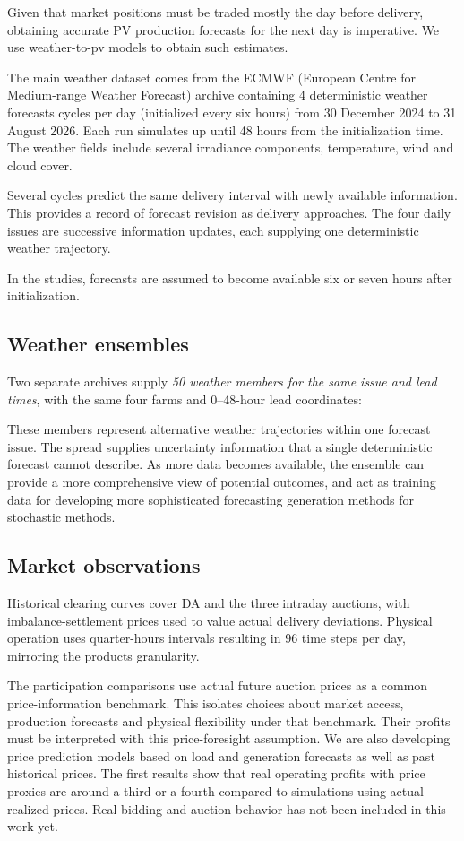 \documentclass[11pt,a4paper]{article}
\begin{document}
Given that market positions must be traded mostly the day before delivery, obtaining accurate
PV production forecasts for the next day is imperative. We use weather-to-pv models to obtain such estimates.

The main weather dataset comes from the ECMWF (European Centre for Medium-range Weather Forecast) archive
 containing 4 deterministic weather forecasts cycles per day (initialized every six hours)
from 30 December 2024 to 31 August 2026. Each run simulates up until 48 hours from the initialization time. 
The weather fields include several irradiance components, temperature, wind and cloud cover.

Several cycles predict the same delivery interval with newly available information. This
provides a record of forecast revision as delivery approaches. The four daily
issues are successive information updates, each supplying one deterministic
weather trajectory.

In the studies, forecasts are assumed to become available six or seven hours after
initialization.

\subsection{Weather ensembles}
Two separate archives supply \emph{50 weather members for the same issue and
lead times}, with the same four farms and 0--48-hour lead coordinates:

These members represent alternative weather trajectories within one forecast
issue. The spread supplies uncertainty information that a single deterministic forecast
cannot describe. As more data becomes available, the ensemble can provide a more comprehensive view of potential outcomes,
and act as training data for developing more sophisticated forecasting generation methods for stochastic methods.


\subsection{Market observations}
Historical clearing curves cover DA and the three intraday auctions, with
imbalance-settlement prices used to value actual delivery deviations. 
Physical operation uses quarter-hours intervals resulting in 96 time steps per day, 
mirroring the products granularity.

The participation comparisons use actual future auction prices as a common
price-information benchmark. This isolates choices about market access,
production forecasts and physical flexibility under that benchmark. Their
profits must be interpreted with this price-foresight assumption. 
We are also developing price prediction models based on load and generation 
forecasts as well as past historical prices. The first results show that 
real operating profits with price proxies are around a third or a fourth 
compared to simulations using actual realized prices. Real bidding and auction behavior 
has not been included in this work yet.
\end{document}
